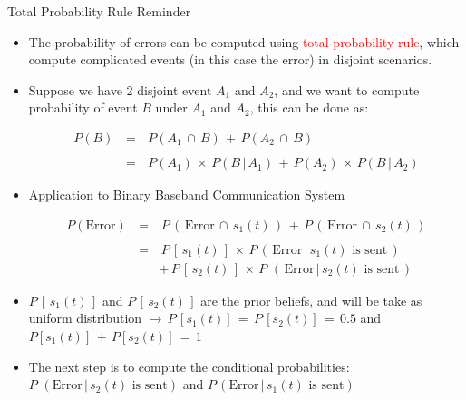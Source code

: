 \documentclass{Beamer}
\begin{document}
\begin{frame}[t,allowframebreaks]{Total Probability Rule Reminder}

\begin{itemize}

\item The probability of errors can be computed using \textcolor{red}{total probability rule}, which compute complicated events (in this case the error) in disjoint scenarios.

\item  Suppose we have 2 disjoint event $A_1$ and $A_2$, and we want to compute probability of event $B$ under $A_1$ and $A_2$, this can be done as:

\begin{equation}
\begin{array}{rcl}
P(B) \, &=& \, P(A_1 \, \cap \, B) \, + \, P(A_2 \, \cap \, B) \\ \\
		 &=& \, P(A_1) \, \times \, P(B \, | \, A_1) \, +\,  P(A_2) \, \times \, P(B \, | \, A_2)
\end{array}
\end{equation} 

\item Application to Binary Baseband Communication System

\begin{equation}
\begin{array}{rcl}
P(\text{Error}) \, &=& \, P \,( \,\text{Error} \, \cap \, s_1(t) \,) \, + \, P \, (\, \text{Error} \, \cap \, s_2(t) \, ) \\ \\
		 &=& \, P \,[\, s_1(t) \,] \, \times \, P \, (\, \text{Error} \, | \, s_1(t) \text{ is sent} \,)   \\
		&& + \,  P \, [ \,s_2(t) \, ] \, \times \,P \, \,(\, \text{Error} \, | \, s_2(t)\text{ is sent} \,)
\end{array}
\label{Eq:Baseband_Binary:proba_error}
\end{equation} 

\item $P \,[\, s_1(t) \,] $ and $P \, [ \,s_2(t) \, ]$ are the prior beliefs, and will be take as uniform distribution $\rightarrow \, P \,[s_1(t)] \, = \, P \, [s_2(t)] \, = \, 0.5$ and $P[s_1(t)] \, + \, P[s_2(t)] \, = \, 1$ 

\item The next step is to compute the conditional probabilities: $P \, \,(\text{Error} \, | \, s_2(t)\text{ is sent})$ and $ P \, (\text{Error} \, | \, s_1(t) \text{ is sent})$

\end{itemize}

\end{frame}
\end{document}
